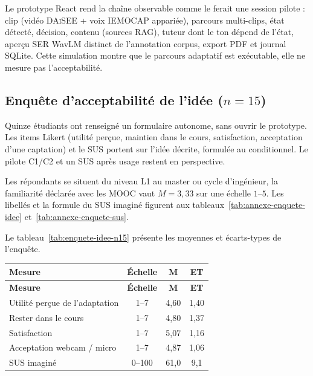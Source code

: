 Le prototype React rend la chaîne observable comme le ferait une session
pilote : clip (vidéo \textsc{DAiSEE} + voix \textsc{IEMOCAP} appariée),
parcours multi-clips, état détecté, décision, contenu (sources RAG),
tuteur dont le ton dépend de l'état, aperçu SER WavLM distinct de
l'annotation corpus, export PDF et journal SQLite. Cette simulation
montre que le parcours adaptatif est exécutable, elle ne mesure pas
l'acceptabilité.

\subsection{Enquête d'acceptabilité de l'idée ($n=15$)}
\label{subsec:val-enquete-idee}

Quinze étudiants ont renseigné un formulaire autonome, sans ouvrir le
prototype. Les items Likert (utilité perçue, maintien dans le cours,
satisfaction, acceptation d'une captation) et le SUS
\cite{brooke1996sus} portent sur l'idée décrite, formulée au
conditionnel. Le pilote C1/C2 et un SUS après usage restent en
perspective.

Les répondants se situent du niveau L1 au master ou cycle d'ingénieur, 
la familiarité déclarée avec les MOOC vaut $M=3{,}33$ sur une échelle
$1$--$5$. Les libellés et la formule du SUS imaginé figurent aux
tableaux~\ref{tab:annexe-enquete-idee} et~\ref{tab:annexe-enquete-sus}.

Le tableau~\ref{tab:enquete-idee-n15} présente les moyennes et
écarts-types de l'enquête.

{\small
\renewcommand{\arraystretch}{1.18}
\setlength{\tabcolsep}{4pt}
\begin{xltabular}{\textwidth}{|>{\raggedright\arraybackslash}X|c|c|c|}
\hline
{}
\textbf{Mesure} & \textbf{Échelle} & $\mathbf{M}$ & \textbf{ET} \\
\hline
\endfirsthead
\hline
{}
\textbf{Mesure} & \textbf{Échelle} & $\mathbf{M}$ & \textbf{ET} \\
\hline
\endhead
\endfoot
\endlastfoot
Utilité perçue de l'adaptation & 1--7 & 4{,}60 & 1{,}40 \\
\hline
Rester dans le cours & 1--7 & 4{,}80 & 1{,}37 \\
\hline
Satisfaction & 1--7 & 5{,}07 & 1{,}16 \\
\hline
Acceptation webcam / micro & 1--7 & 4{,}87 & 1{,}06 \\
\hline
SUS imaginé & 0--100 & 61{,}0 & 9{,}1 \\
\hline
\end{xltabular}
\label{tab:enquete-idee-n15}
}

